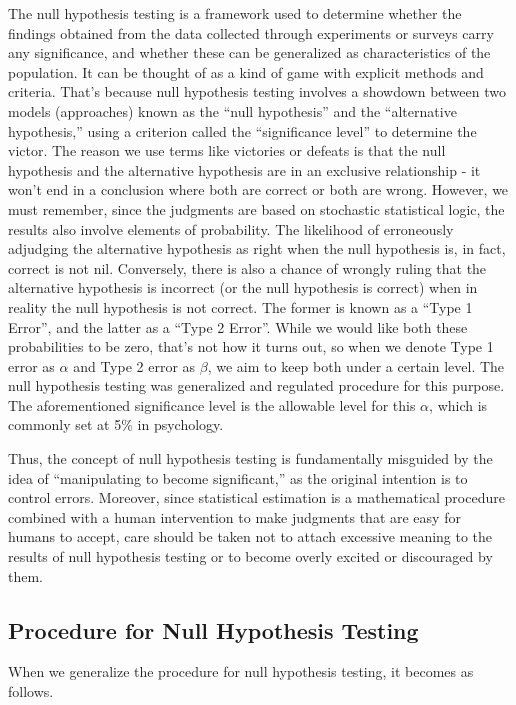 \documentclass[
  a4paper,
]{book}
\begin{document}
The null hypothesis testing is a framework used to determine whether the
findings obtained from the data collected through experiments or surveys
carry any significance, and whether these can be generalized as
characteristics of the population. It can be thought of as a kind of
game with explicit methods and criteria. That's because null hypothesis
testing involves a showdown between two models (approaches) known as the
``null hypothesis'' and the ``alternative hypothesis,'' using a
criterion called the ``significance level'' to determine the victor. The
reason we use terms like victories or defeats is that the null
hypothesis and the alternative hypothesis are in an exclusive
relationship - it won't end in a conclusion where both are correct or
both are wrong. However, we must remember, since the judgments are based
on stochastic statistical logic, the results also involve elements of
probability. The likelihood of erroneously adjudging the alternative
hypothesis as right when the null hypothesis is, in fact, correct is not
nil. Conversely, there is also a chance of wrongly ruling that the
alternative hypothesis is incorrect (or the null hypothesis is correct)
when in reality the null hypothesis is not correct. The former is known
as a ``Type 1 Error'', and the latter as a ``Type 2 Error''. While we
would like both these probabilities to be zero, that's not how it turns
out, so when we denote Type 1 error as \(\alpha\) and Type 2 error as
\(\beta\), we aim to keep both under a certain level. The null
hypothesis testing was generalized and regulated procedure for this
purpose. The aforementioned significance level is the allowable level
for this \(\alpha\), which is commonly set at 5\% in psychology.

Thus, the concept of null hypothesis testing is fundamentally misguided
by the idea of ``manipulating to become significant,'' as the original
intention is to control errors. Moreover, since statistical estimation
is a mathematical procedure combined with a human intervention to make
judgments that are easy for humans to accept, care should be taken not
to attach excessive meaning to the results of null hypothesis testing or
to become overly excited or discouraged by them.

\subsection{Procedure for Null Hypothesis
Testing}\label{procedure-for-null-hypothesis-testing}

When we generalize the procedure for null hypothesis testing, it becomes
as follows.
\end{document}
